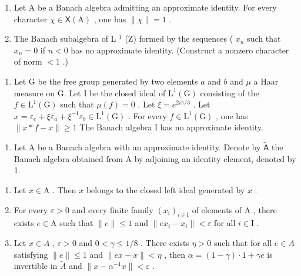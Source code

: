 \begin{enumerate}
\def\labelenumi{\alph{enumi})}
\setcounter{enumi}{1}
\item
  Let A be a Banach algebra admitting an approximate identity. For every character \(\chi\in\mathsf{X}(\mathrm{A})\) , one has \(\|\chi\|=1\) .
\item
  The Banach subalgebra of L \(^{1}\) (Z) formed by the sequences ( \(x_{n}\) such that \(x_{n} = 0\) if \(n < 0\) has no approximate identity. (Construct a nonzero character of norm \(< 1\) .)
\end{enumerate}

\begin{enumerate}
\def\labelenumi{\alph{enumi})}
\setcounter{enumi}{3}
\tightlist
\item
  Let G be the free group generated by two elements \(a\) and \(b\) and \(\mu\) a Haar measure on G. Let I be the closed ideal of \(\mathrm{L}^1 (\mathrm{G})\) consisting of the \(f\in \mathrm{L}^{1}(\mathrm{G})\) such that \(\mu (f) = 0\) . Let \(\xi = e^{2i\pi /3}\) . Let \(x = \varepsilon_{e} + \xi \varepsilon_{a} + \xi^{-1}\varepsilon_{b}\in \mathrm{L}^{1}(\mathrm{G})\) . For every \(f\in \mathrm{L}^{1}(\mathrm{G})\) , one has \(\| x*f - x\| \geqslant 1\) The Banach algebra I has no approximate identity.
\end{enumerate}

\begin{enumerate}
\def\labelenumi{¶ \arabic{enumi})}
\setcounter{enumi}{29}
\tightlist
\item
  Let A be a Banach algebra with an approximate identity. Denote by \(\widetilde{\mathsf{A}}\) the Banach algebra obtained from A by adjoining an identity element, denoted by 1.
\end{enumerate}

\begin{enumerate}
\def\labelenumi{\alph{enumi})}
\item
  Let \(x \in \mathrm{A}\) . Then \(x\) belongs to the closed left ideal generated by \(x\) .
\item
  For every \(\varepsilon > 0\) and every finite family \((x_i)_{i \in \mathrm{I}}\) of elements of \(\mathrm{A}\) , there exists \(e \in \mathrm{A}\) such that \(\| e \| \leqslant 1\) and \(\| ex_i - x_i \| < \varepsilon\) for all \(i \in \mathrm{I}\) .
\item
  Let \(x \in A\) , \(\varepsilon > 0\) and \(0 < \gamma \leqslant 1/8\) . There exists \(\eta > 0\) such that for all \(e \in A\) satisfying \(\|e\| \leqslant 1\) and \(\|ex - x\| < \eta\) , then \(\alpha = (1 - \gamma) \cdot 1 + \gamma e\) is invertible in \(\widetilde{A}\) and \(\|x - \alpha^{-1}x\| < \varepsilon\) .
\end{enumerate}

